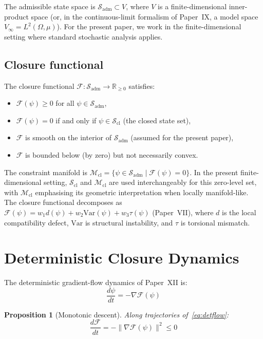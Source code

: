 \documentclass[12pt]{article}
\newtheorem{proposition}[theorem]{Proposition}
\newcommand{\Mcl}{\mathcal{M}_{\mathrm{cl}}}
\newcommand{\Fcal}{\mathcal{F}}
\newcommand{\Sadm}{\mathcal{S}_{\mathrm{adm}}}
\newcommand{\Scl}{\mathcal{S}_{\mathrm{cl}}}
\begin{document}
The admissible state space is $\Sadm \subset V$, where $V$ is a finite-dimensional inner-product space (or, in the continuous-limit formalism of Paper~IX, a model space $V_\infty = L^2(\Omega, \mu)$). For the present paper, we work in the finite-dimensional setting where standard stochastic analysis applies.

\subsection{Closure functional}

The closure functional $\Fcal : \Sadm \to \mathbb{R}_{\geq 0}$ satisfies:
\begin{itemize}
    \item $\Fcal(\psi) \geq 0$ for all $\psi \in \Sadm$,
    \item $\Fcal(\psi) = 0$ if and only if $\psi \in \Scl$ (the closed state set),
    \item $\Fcal$ is smooth on the interior of $\Sadm$ (assumed for the present paper),
    \item $\Fcal$ is bounded below (by zero) but not necessarily convex.
\end{itemize}

The constraint manifold is $\Mcl = \{\psi \in \Sadm \mid \Fcal(\psi) = 0\}$. In the present finite-dimensional setting, $\Scl$ and $\Mcl$ are used interchangeably for this zero-level set, with $\Mcl$ emphasising its geometric interpretation when locally manifold-like. The closure functional decomposes as $\Fcal(\psi) = w_1 d(\psi) + w_2 \mathrm{Var}(\psi) + w_3 \tau(\psi)$ (Paper~VII), where $d$ is the local compatibility defect, $\mathrm{Var}$ is structural instability, and $\tau$ is torsional mismatch.

\section{Deterministic Closure Dynamics}\label{sec:deterministic}

The deterministic gradient-flow dynamics of Paper~XII is:
\begin{equation}\label{eq:detflow}
    \frac{d\psi}{dt} = -\nabla\Fcal(\psi)
\end{equation}

\begin{proposition}[Monotonic descent]\label{prop:descent}
Along trajectories of~\eqref{eq:detflow}:
\begin{equation}
    \frac{d\Fcal}{dt} = -\|\nabla\Fcal(\psi)\|^2 \leq 0
\end{equation}
\end{proposition}
\end{document}
